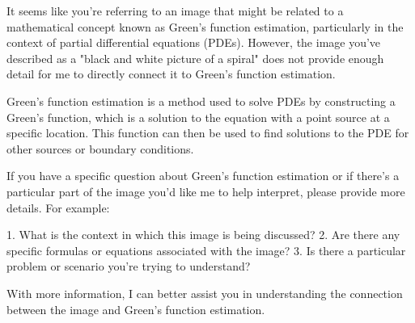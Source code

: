 It seems like you're referring to an image that might be related to a mathematical concept known as Green's function estimation, particularly in the context of partial differential equations (PDEs). However, the image you've described as a "black and white picture of a spiral" does not provide enough detail for me to directly connect it to Green's function estimation.

Green's function estimation is a method used to solve PDEs by constructing a Green's function, which is a solution to the equation with a point source at a specific location. This function can then be used to find solutions to the PDE for other sources or boundary conditions.

If you have a specific question about Green's function estimation or if there's a particular part of the image you'd like me to help interpret, please provide more details. For example:

1. What is the context in which this image is being discussed?
2. Are there any specific formulas or equations associated with the image?
3. Is there a particular problem or scenario you're trying to understand?

With more information, I can better assist you in understanding the connection between the image and Green's function estimation.
